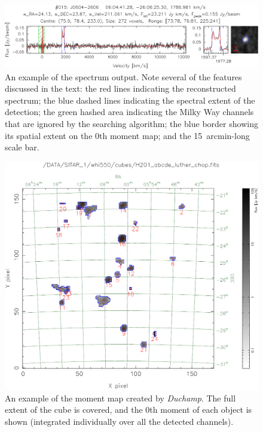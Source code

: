 \documentclass[12pt,a4paper]{article}
\newcommand{\duchamp}{\emph{Duchamp}}
\begin{document}
\begin{figure}[t]
\begin{center}
\includegraphics[width=\textwidth]{example_spectrum}
\end{center}
\caption{\footnotesize An example of the spectrum output. Note several
  of the features discussed in the text: the red lines indicating the
  reconstructed spectrum; the blue dashed lines indicating the
  spectral extent of the detection; the green hashed area indicating
  the Milky Way channels that are ignored by the searching algorithm;
  the blue border showing its spatial extent on the 0th moment map;
  and the 15~arcmin-long scale bar.}
\label{fig-spect}
\end{figure}

\begin{figure}[!t]
\begin{center}
\includegraphics[width=\textwidth]{example_moment_map}
\end{center}
\caption{\footnotesize An example of the moment map created by
  \duchamp. The full extent of the cube is covered, and the 0th moment
  of each object is shown (integrated individually over all the
  detected channels).}
\label{fig-moment}
\end{figure}
\end{document}
